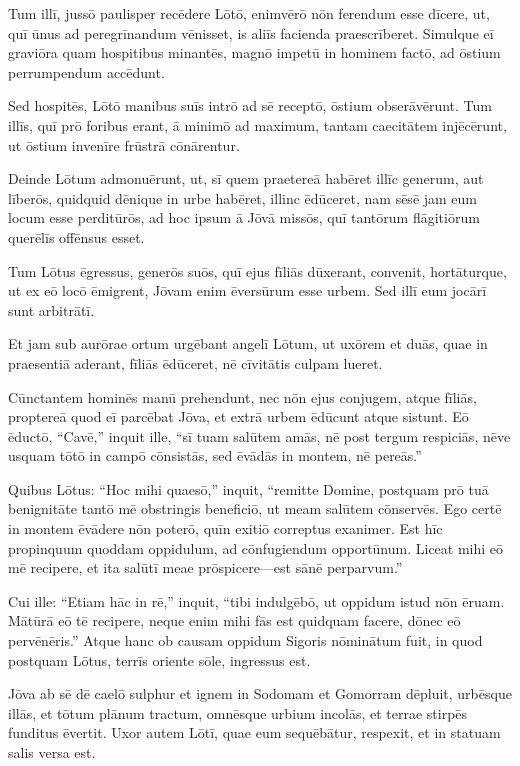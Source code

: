 \Versus Tum illī, jussō paulisper recēdere Lōtō, enimvērō nōn ferendum esse dīcere, ut, quī ūnus ad peregrīnandum vēnisset, is aliīs facienda praescrīberet. Simulque eī graviōra quam hospitibus minantēs, magnō impetū in hominem factō, ad ōstium perrumpendum accēdunt.

\Versus Sed hospitēs, Lōtō manibus suīs intrō ad sē receptō, ōstium obserāvērunt.
\Versus Tum illīs, quī prō foribus erant, ā minimō ad maximum, tantam caecitātem injēcērunt, ut ōstium invenīre frūstrā cōnārentur.

\Versus Deinde Lōtum admonuērunt, ut, sī quem praetereā habēret illīc generum, aut līberōs, quidquid dēnique in urbe habēret, illinc ēdūceret,
\Versus nam sēsē jam eum locum esse perditūrōs, ad hoc ipsum ā Jōvā missōs, quī tantōrum flāgitiōrum querēlīs offēnsus esset.

\Versus Tum Lōtus ēgressus, generōs suōs, quī ejus fīliās dūxerant, convenit, hortāturque, ut ex eō locō ēmigrent, Jōvam enim ēversūrum esse urbem. Sed illī eum jocārī sunt arbitrātī.

\Versus Et jam sub aurōrae ortum urgēbant angelī Lōtum, ut uxōrem et duās, quae in praesentiā aderant, fīliās ēdūceret, nē cīvitātis culpam lueret.

\Versus Cūnctantem hominēs manū prehendunt, nec nōn ejus conjugem, atque fīliās, proptereā quod eī parcēbat Jōva, et extrā urbem ēdūcunt atque sistunt.
\Versus Eō ēductō, ``Cavē,'' inquit ille, ``sī tuam salūtem amās, nē post tergum respiciās, nēve usquam tōtō in campō cōnsistās, sed ēvādās in montem, nē pereās.''

\Versus Quibus Lōtus: ``Hoc mihi quaesō,'' inquit, ``remitte Domine,
\Versus postquam prō tuā benignitāte tantō mē obstringis beneficiō, ut meam salūtem cōnservēs. Ego certē in montem ēvādere nōn poterō, quīn exitiō correptus exanimer.
\Versus Est hīc propinquum quoddam oppidulum, ad cōnfugiendum opportūnum. Liceat mihi eō mē recipere, et ita salūtī meae prōspicere—est sānē perparvum.''

\Versus Cui ille: ``Etiam hāc in rē,'' inquit, ``tibi indulgēbō, ut oppidum istud nōn ēruam.
\Versus Mātūrā eō tē recipere, neque enim mihi fās est quidquam facere, dōnec eō pervēnēris.'' Atque hanc ob causam oppidum Sigoris nōminātum fuit,
\Versus in quod postquam Lōtus, terrīs oriente sōle, ingressus est.

\Versus Jōva ab sē dē caelō sulphur et ignem in Sodomam et Gomorram dēpluit,
\Versus urbēsque illās, et tōtum plānum tractum, omnēsque urbium incolās, et terrae stirpēs funditus ēvertit. 
\Versus Uxor autem Lōtī, quae eum sequēbātur, respexit, et in statuam salis versa est.

